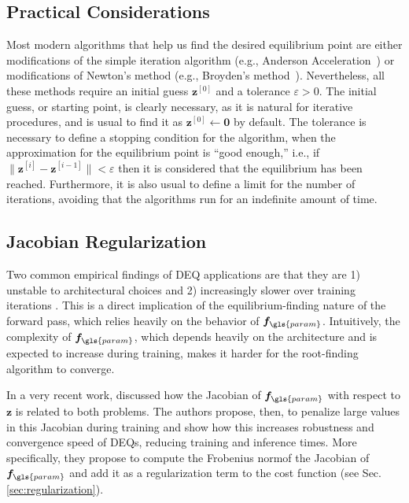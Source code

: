 \subsection{Practical Considerations}

Most modern algorithms that help us find the desired equilibrium point are either modifications of the simple iteration algorithm (e.g., Anderson Acceleration~\cite{walker_anderson_2011}) or modifications of Newton's method (e.g., Broyden's method~\cite{broyden_class_1965}).
Nevertheless, all these methods require an initial guess $\bm{z}^{[0]}$ and a tolerance $\varepsilon>0$. 
The initial guess, or starting point, is clearly necessary, as it is natural for iterative procedures, and is usual to find it as $\bm{z}^{[0]}\gets \bm{0}$ by default.
The tolerance is necessary to define a stopping condition for the algorithm, when the approximation for the equilibrium point is ``good enough,'' i.e., if $\|\bm{z}^{[i]}-\bm{z}^{[i-1]}\|<\varepsilon$ then it is considered that the equilibrium has been reached.
Furthermore, it is also usual to define a limit for the number of iterations, avoiding that the algorithms run for an indefinite amount of time.

\subsection{Jacobian Regularization}\label{sec:deq-jac-reg}

Two common empirical findings of \gls{DEQ} applications are that they are 1) unstable to architectural choices \cite{bai_stabilizing_2021} and 2) increasingly slower over training iterations \cite{Bai2019,winston_monotone_2020}.
This is a direct implication of the equilibrium-finding nature of the forward pass, which relies heavily on the behavior of $\bm{f}_{\gls{param}}$.
Intuitively, the complexity of $\bm{f}_{\gls{param}}$, which depends heavily on the architecture and is expected to increase during training, makes it harder for the root-finding algorithm to converge.

In a very recent work, \textcite{bai_stabilizing_2021} discussed how the Jacobian of $\bm{f}_{\gls{param}}$ with respect to $\bm{z}$ is related to both problems.
The authors propose, then, to penalize large values in this Jacobian during training and show how this increases robustness and convergence speed of \gls{DEQ}s, reducing training and inference times.
More specifically, they propose to compute the Frobenius norm\footnotemark of the Jacobian of $\bm{f}_{\gls{param}}$ and add it as a regularization term to the cost function (see Sec. \ref{sec:regularization}).

